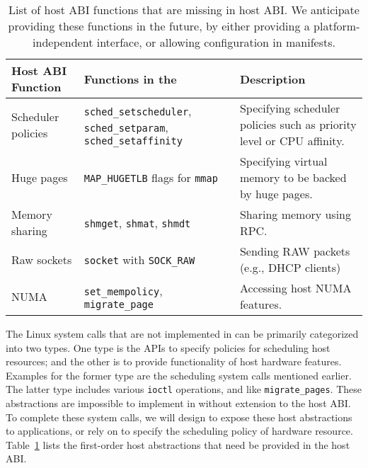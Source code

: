 \begin{table}[t]
\footnotesize
\centering
\begin{tabular}{|p{1.2in}|p{2.4in}|p{2.4in}|}
\hline
{\bf Host ABI Function} & {\bf Functions in the \libos{}} & {\bf Description} \\
\hline
Scheduler policies & {\tt sched\_setscheduler}, {\tt sched\_setparam}, {\tt sched\_setaffinity} & Specifying scheduler policies such as priority level or CPU affinity.\\
\hline
Huge pages & {\tt MAP\_HUGETLB} flags for {\tt mmap} & Specifying virtual memory to be backed by huge pages. \\
\hline
Memory sharing & {\tt shmget}, {\tt shmat}, {\tt shmdt} & Sharing memory using RPC. \\
\hline
Raw sockets & {\tt socket} with {\tt SOCK\_RAW}  & Sending RAW packets (e.g., DHCP clients) \\
\hline
NUMA & {\tt set\_mempolicy}, {\tt migrate\_page} & Accessing host NUMA features. \\
\hline
\end{tabular}
\caption[List of host ABI functions to be added in \graphene{} as future works]
{List of host ABI functions that are missing in \graphene{} host ABI.
We anticipate providing these functions in the future,
by either providing a platform-independent interface,
or allowing configuration in manifests.}
\label{tab:future:abi}
\end{table}


The Linux system calls that are not implemented in \graphene{}
can be primarily categorized into two types.
One type is the APIs
to specify policies for scheduling host resources;
and the other is to provide functionality of host hardware features.
Examples for the former type are the scheduling system calls mentioned earlier.
The latter type includes
various {\tt ioctl} operations,
and  like {\tt migrate\_pages}.
These abstractions are impossible to implement in \liboses{}
without extension to the host ABI.
To complete these system calls,
we will design  to expose these host abstractions
to applications,
or rely on 
to specify the scheduling policy of hardware resource.
Table~\ref{tab:future:abi} lists the first-order host abstractions
that need be provided in the \graphene{} host ABI.


